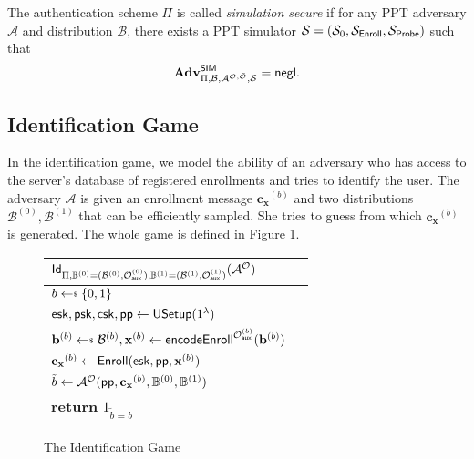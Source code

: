 The authentication scheme $\Pi$ is called \emph{simulation secure} if for any PPT adversary $\mathcal{A}$ and distribution $\mathcal{B}$, there exists a PPT simulator $\mathcal{S} = (\mathcal{S}_0, \mathcal{S}_{\sf Enroll}, \mathcal{S}_{\sf Probe})$ such that
\[
	\mathbf{Adv}^{\sf SIM}_{\Pi, \mathcal{B}, \mathcal{A}^{\mathcal{O}, \tilde{\mathcal{O}}}, \mathcal{S}} = \mathsf{negl}.
\]


\subsection*{Identification Game}
\label{sec:id_game}

In the identification game, we model the ability of an adversary who has access to the server's database of registered enrollments and tries to identify the user. The adversary $\mathcal{A}$ is given an enrollment message $\mathbf{c_x}^{(b)}$ and two distributions $\mathcal{B}^{(0)}, \mathcal{B}^{(1)}$ that can be efficiently sampled. She tries to guess from which $\mathbf{c_x}^{(b)}$ is generated. The whole game is defined in Figure \ref{fig:id_game}.

\begin{figure}[h]
	\begin{center}
	\begin{tabular}{l c}
		${\sf Id}_{\Pi, \mathbb{B}^{(0)} = (\mathcal{B}^{(0)}, \mathcal{O}_{\sf aux}^{(0)}) , \mathbb{B}^{(1)} = (\mathcal{B}^{(1)}, \mathcal{O}_{\sf aux}^{(1)} )}(\mathcal{A}^\mathcal{O})$\\

			\hline

			$b \getsdollar \{0, 1\}$ \\

			${\sf esk}, {\sf psk}, {\sf csk}, {\sf pp} \gets {\sf USetup}(1^\lambda)$ \\

			$ \mathbf{b}^{(b)} \getsdollar \mathcal{B}^{(b)}, \mathbf{x}^{(b)} \gets {\sf encodeEnroll}^{\mathcal{O}_{\sf aux}^{(b)}}(\mathbf{b}^{(b)})$ \\

			$\mathbf{c_x}^{(b)} \gets {\sf Enroll}({\sf esk}, {\sf pp}, \mathbf{x}^{(b)})$ \\

			$\tilde{b} \gets \mathcal{A}^{\mathcal{O}} ( {\sf pp}, \mathbf{c_x}^{(b)}, \mathbb{B}^{(0)}, \mathbb{B}^{(1)} )$ \\

			\textbf{return} $1_{\tilde{b} = b}$
			
	\end{tabular}
	\end{center}
	\caption{The Identification Game}
	\label{fig:id_game}
\end{figure}


